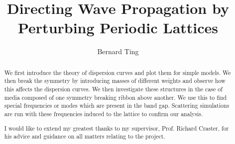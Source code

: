 \documentclass[a4paper, twoside]{report}
\title{Directing Wave Propagation by Perturbing Periodic Lattices}
\author{Bernard Ting}
\begin{document}


\begin{abstract}
We first introduce the theory of dispersion curves and plot them for simple
models. We then break the symmetry by introducing masses of different weights
and observe how this affects the dispersion curves. We then investigate these
structures in the case of media composed of one symmetry breaking ribbon above
another. We use this to find special frequencies or modes which are present in
the band gap. Scattering simulations are run with these frequencies induced to
the lattice to confirm our analysis.
\end{abstract}

\renewcommand{\abstractname}{Acknowledgements}
\begin{abstract}
I would like to extend my greatest thanks to my supervisor, Prof. Richard Craster, for his advice and guidance on all matters relating to the project.
\end{abstract}

\tableofcontents
\listoffigures
\listoftables











\end{document}

